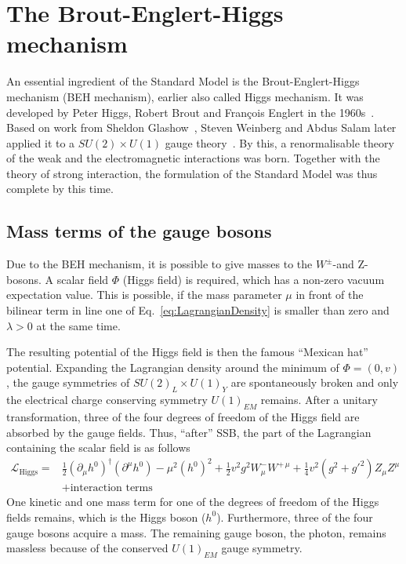 \section{The Brout-Englert-Higgs mechanism}
\label{sec:HiggsMechanism}
An essential ingredient of the Standard Model is the Brout-Englert-Higgs mechanism (BEH mechanism), earlier also called Higgs mechanism.
It was developed by Peter Higgs, Robert Brout and Fran\c{c}ois Englert in the 1960s~\cite{bib:HiggsMechanism_Brout_Englert,bib:Higgs_Prediction,bib:Higgs_Prediction_2,bib:HiggsMechanism_Guralnik_Hagen_Kibble,bib:HiggsMechanism_Higgs_1966,bib:HiggsMechanism_Kibble_1967}. Based on work from Sheldon Glashow~\cite{bib:HiggsMechanism_Glashow_1961}, Steven Weinberg and Abdus Salam later applied it to a $SU(2) \times U(1)$ gauge theory~\cite{bib:HiggsMechanism_Weinberg_1967,bib:HiggsMechanism_Salam_1968}.
By this, a renormalisable theory of the weak and the electromagnetic interactions was born.
Together with the theory of strong interaction, the formulation of the Standard Model was thus complete by this time.

\subsection*{Mass terms of the gauge bosons}
Due to the BEH mechanism, it is possible to give masses to the $W^{\pm}$-and Z-bosons.
A scalar field $\Phi$ (Higgs field) is required, which has a non-zero vacuum expectation value.
This is possible, if the mass parameter $\mu$ in front of the bilinear term in line one of Eq.~\eqref{eq:LagrangianDensity} is smaller than zero and $\lambda>0$ at the same time.

The resulting potential of the Higgs field is then the famous ``Mexican hat'' potential.
Expanding the Lagrangian density around the minimum of $\Phi = \left( 0,v \right)$, the gauge symmetries of $SU(2)_L \times U(1)_Y$ are spontaneously broken and only the electrical charge conserving symmetry $U(1)_{EM}$ remains.
After a unitary transformation, three of the four degrees of freedom of the Higgs field are absorbed by the gauge fields.
Thus, ``after'' SSB, the part of the Lagrangian containing the scalar field is as follows
\begin{equation}
\begin{split}
\mathcal{L}_{\text{Higgs}} =& \frac{1}{2} \left( \partial_{\mu} h^0 \right)^{\dagger} \left( \partial^{\mu} h^0 \right) - \mu^2 \left(h^0\right)^2 + \frac{1}{2} v^2 g^2 W_{\mu}^- W^{+\,\mu}
                    + \frac{1}{4} v^2 \left(g^2 + g'^2  \right)  Z_{\mu} Z^{\mu}\\
  &+ \text{interaction terms}
\end{split}
\label{eq:LHiggs}
\end{equation}
One kinetic and one mass term for one of the degrees of freedom of the Higgs fields remains, which is the Higgs boson ($h^0$).
Furthermore, three of the four gauge bosons acquire a mass.
The remaining gauge boson, the photon, remains massless because of the conserved $U(1)_{EM}$ gauge symmetry.

